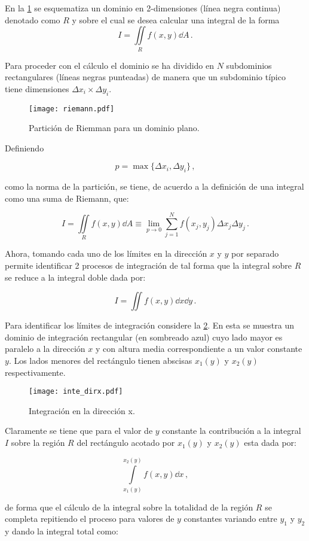 En la \cref{fig:rieman} se esquematiza un dominio en 2-dimensiones (línea negra continua) denotado como $R$ y sobre el cual se desea calcular una integral de la forma
\[I = \iint\limits_R f(x,y) \dd{A}\, . \]

Para proceder con el cálculo el dominio se ha dividido en $N$ subdominios 
rectangulares (líneas negras punteadas) de manera que un subdominio típico 
tiene dimensiones $\Delta {x_i} \times \Delta {y_i}$.

\begin{figure}[H]
\centering
\texttt{[image: riemann.pdf]}
\caption{Partición de Riemman para un dominio plano.}
\label{fig:rieman}
\end{figure}

Definiendo

\[p = \max\{ \Delta {x_i}, \Delta {y_i} \}\, ,\]

como la norma de la partición, se tiene, de acuerdo a la definición de una integral como una suma de Riemann, que:

\[I = \iint\limits_R  f(x,y) \dd{A}  \equiv \lim_{p \to 0} \sum_{j=1}^N f(x_j,y_j) \Delta x_j \Delta y_j\, .\]

Ahora, tomando cada uno de los límites en la dirección $x$ y $y$ por separado permite identificar 2 procesos de integración de tal forma que la integral sobre $R$ se reduce a la integral doble dada por:

\[I = \iint f(x,y) \dd{x}\dd{y}\, . \]

Para identificar los límites de integración considere la \cref{fig:dirx}. En esta se muestra un dominio de integración rectangular (en sombreado azul) cuyo lado mayor es paralelo a la dirección $x$ y con altura media correspondiente a un valor constante $y$. Los lados menores del rectángulo tienen abscisas $x_1(y)$ y $x_2(y)$ respectivamente.
\begin{figure}[H]
\centering
\texttt{[image: inte\_dirx.pdf]}
\caption{Integración en la dirección x.}
\label{fig:dirx}
\end{figure}

Claramente se tiene que para el valor de $y$ constante la contribución a la integral $I$ sobre la región $R$ del rectángulo acotado por ${x_1}(y)$ y ${x_2}(y)$ esta dada por:

\[\int\limits_{x_1(y)}^{x_2(y)} f(x,y) \dd{x}\, ,\]

de forma que el cálculo de la integral sobre la totalidad de la región $R$ se 
completa repitiendo el proceso para valores de $y$ constantes variando entre 
$y_1$ y $y_2$ y dando la integral total como:

